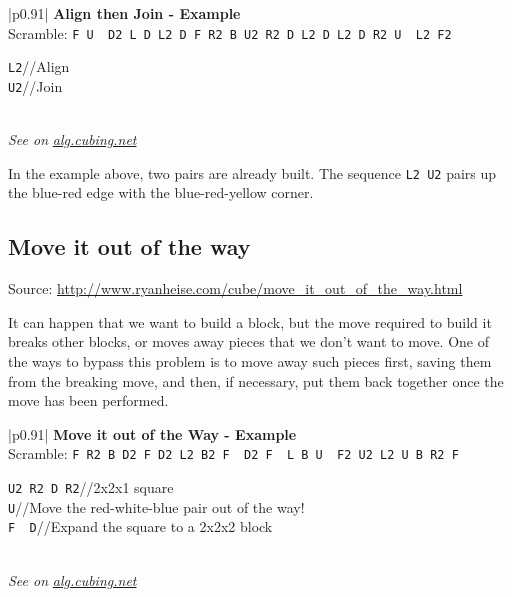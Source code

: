 \documentclass[11pt,a4paper]{book}
\newcommand{\p}{\textquotesingle}
\newcommand{\m}{\texttt}
\newcommand{\ps}{\p\,\,}
\newcommand{\comment}[1]{{\color{gray}\quad//#1}}
\begin{document}
\bigskip
\begin{tabular}{|p{}|}
\hline
\textbf{Align then Join - Example}\\
\hline
Scramble: \m{F U\ps D2 L D L2 D F R2 B U2 R2 D L2 D L2 D R2 U\ps L2 F2}\\
\hline
\begin{minipage}[l]{0.650\textwidth}
\m{L2}\comment{Align}\\
\m{U2}\comment{Join}
\end{minipage}
\begin{minipage}[c]{0.25\textwidth}

\end{minipage}\\
\hline
\emph{See on }\href{https://alg.cubing.net/?alg=L2_\%2F\%2FAlign\%0AU2_\%2F\%2FJoin&setup=F_U-_D2_L_D_L2_D_F_R2_B_U2_R2_D_L2_D_L2_D_R2_U-_L2_F2}{\emph{alg.cubing.net}}\\
\hline
\end{tabular}
\bigskip

In the example above, two pairs are already built. The sequence \m{L2 U2} pairs up the blue-red edge with the blue-red-yellow corner.

\subsection{Move it out of the way}
Source: \url{http://www.ryanheise.com/cube/move_it_out_of_the_way.html}\bigskip

It can happen that we want to build a block, but the move required to build it breaks other blocks, or moves away pieces that we don't want to move. One of the ways to bypass this problem is to move away such pieces first, saving them from the breaking move, and then, if necessary, put them back together once the move has been performed.

\bigskip
\begin{tabular}{|p{}|}
\hline
\textbf{Move it out of the Way - Example}\\
\hline
Scramble: \m{F R2 B D2 F D2 L2 B2 F\ps D2 F\ps L B U\ps F2 U2 L2 U B R2 F}\\
\hline
\begin{minipage}[l]{0.650\textwidth}
\m{U2 R2 D R2}\comment{2x2x1 square}\\
\m{U\p}\comment{Move the red-white-blue pair out of the way!}\\
\m{F\ps D\p}\comment{Expand the square to a 2x2x2 block}
\end{minipage}
\begin{minipage}[c]{0.25\textwidth}

\end{minipage}\\
\hline
\emph{See on }\href{https://alg.cubing.net/?setup=F_R2_B_D2_F_D2_L2_B2_F-_D2_F-_L_B_U-_F2_U2_L2_U_B_R2_F&alg=U2_R2_D_R2_\%2F\%2F2x2x1_square\%0AU-_\%2F\%2FMove_the_red\%26\%2345\%3Bwhite\%26\%2345\%3Bblue_pair_out_of_the_way\%0AF-_D-_\%2F\%2FExpand_the_square_to_a_2x2x2_block}{\emph{alg.cubing.net}}\\
\hline
\end{tabular}
\bigskip
\end{document}
